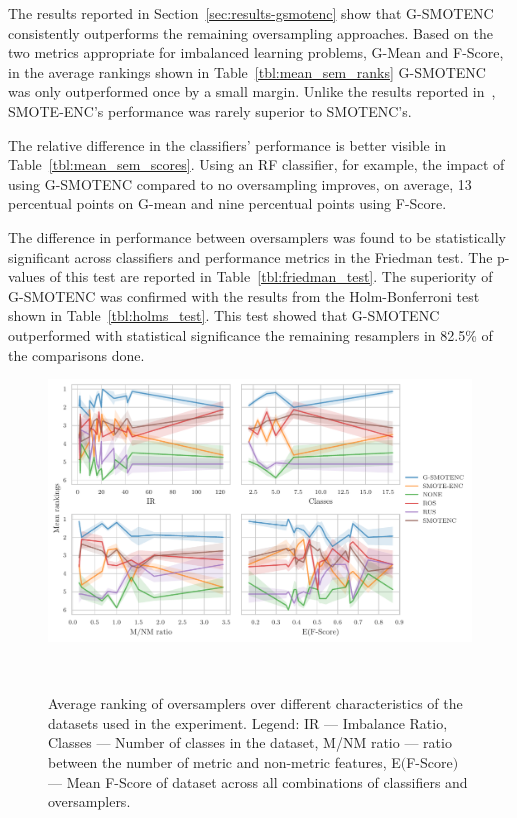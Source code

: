 The results reported in Section~\ref{sec:results-gsmotenc} show that G-SMOTENC
consistently outperforms the remaining oversampling approaches. Based on the
two metrics appropriate for imbalanced learning problems, G-Mean and F-Score,
in the average rankings shown in Table~\ref{tbl:mean_sem_ranks} G-SMOTENC was
only outperformed once by a small margin. Unlike the results reported
in~\cite{mukherjee2021smote}, SMOTE-ENC's performance was rarely superior to
SMOTENC's.

The relative difference in the classifiers' performance is better visible in
Table~\ref{tbl:mean_sem_scores}. Using an RF classifier, for example, the
impact of using G-SMOTENC compared to no oversampling improves, on average, 13
percentual points on G-mean and nine percentual points using F-Score. 

The difference in performance between oversamplers was found to be
statistically significant across classifiers and performance metrics in the
Friedman test. The p-values of this test are reported in
Table~\ref{tbl:friedman_test}. The superiority of G-SMOTENC was confirmed with
the results from the Holm-Bonferroni test shown in Table~\ref{tbl:holms_test}.
This test showed that G-SMOTENC outperformed with statistical significance the
remaining resamplers in 82.5\% of the comparisons done.

\begin{figure}[ht]
	\centering
	\includegraphics[width=\linewidth]{consistency_analysis_plot}
    \caption{Average ranking of oversamplers over different characteristics of
        the datasets used in the experiment. Legend: IR --- Imbalance Ratio,
        Classes --- Number of classes in the dataset, M/NM ratio --- ratio
        between the number of metric and non-metric features, E$($F-Score$)$
        --- Mean F-Score of dataset across all combinations of classifiers and
        oversamplers.
    }~\label{fig:consistency_analysis}
\end{figure}


